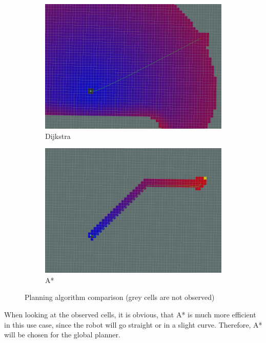 \begin{figure}[H]
	\begin{subfigure}{.5\linewidth}
		\includegraphics[width=\textwidth]{Pictures/Dijkstra}
		\caption{Dijkstra}
	\end{subfigure}	
	\begin{subfigure}{.5\linewidth}
		\includegraphics[width=\textwidth]{Pictures/AStar2}
		\caption{A*}
	\end{subfigure}

	\caption{Planning algorithm comparison (grey cells are not observed)\cite{globalplanner}}
	\label{plannercomparison}

\end{figure}


When looking at the observed cells, it is obvious, that A* is much more efficient in this use case, since the robot will go straight or in a slight curve. Therefore, A* will be chosen for the global planner.\\

